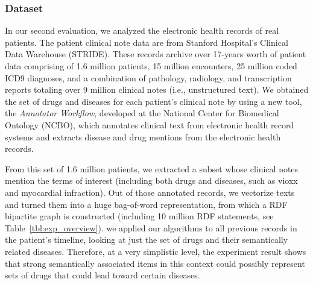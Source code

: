 \subsubsection{Dataset}
In our second evaluation, we analyzed the electronic health records of real patients. The patient clinical note data are from Stanford Hospital's Clinical Data Warehouse (STRIDE). These records archive over 17-years worth of patient data comprising of 1.6 million patients, 15 million encounters, 25 million coded ICD9 diagnoses, and a combination of pathology, radiology, and transcription reports totaling over 9 million clinical notes (i.e., unstructured text).
We obtained the set of drugs and diseases for each patient's clinical note by using a new tool, the \emph{Annotator Workflow}, developed at the National Center for Biomedical Ontology (NCBO), which annotates clinical text from electronic health record systems and extracts disease and drug mentions from the electronic health records.


From this set of 1.6 million patients, we extracted a subset whose clinical notes mention the terms of interest (including both drugs and diseases, such as vioxx and myocardial infraction).  Out of those annotated records, we vectorize texts and turned them into a huge bag-of-word representation, from which a RDF bipartite graph is constructed (including 10 million RDF statements, see Table~\ref{tbl:exp_overview}). we applied our algorithms to all previous records in the patient's timeline, looking at just the set of drugs and their semantically related diseases.  Therefore, at a very simplistic level, the experiment result shows that strong semantically associated items in this context could possibly represent sets of drugs that could lead toward certain diseases.

